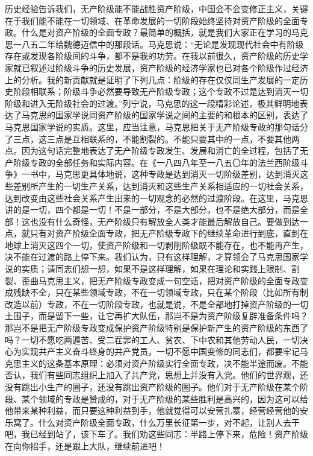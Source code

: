 \begin{maonote}
历史经验告诉我们，无产阶级能不能战胜资产阶级，中国会不会变修正主义，关键在于我们能不能在一切领域、在革命发展的一切阶段始终坚持对资产阶级的全面专政。什么是对资产阶级的全面专政？最简单的概括，就是我们大家正在学习的马克思一八五二年给魏德迈信中的那段话。马克思说：“无论是发现现代社会中有阶级存在或发现各阶级间的斗争，都不是我的功劳。在我以前很久，资产阶级的历史学家就已叙述过阶级斗争的历史发展，资产阶级的经济学家也已对各个阶级作过经济上的分析。我的新贡献就是证明了下列几点：阶级的存在仅仅同生产发展的一定历史阶段相联系；阶级斗争必然要导致无产阶级专政；这个专政不过是达到消灭一切阶级和进入无阶级社会的过渡。”列宁说，马克思的这一段精彩论述，极其鲜明地表达了马克思的国家学说同资产阶级的国家学说之间的主要的和根本的区别，表达了马克思国家学说的实质。这里，应当注意，马克思把关于无产阶级专政的那句话分了三点，这三点是互相联系的，不能割裂的。不能只要其中的一点，不要其他两点。因为这句话完整地表达了无产阶级专政发生、发展和消亡的全过程，包括了无产阶级专政的全部任务和实际内容。在《一八四八年至一八五〇年的法兰西阶级斗争》一书中，马克思更具体地说，这种专政是达到消灭一切阶级差别，达到消灭这些差别所产生的一切生产关系，达到消灭和这些生产关系相适应的一切社会关系，达到改变由这些社会关系产生出来的一切观念的必然的过渡阶段。在这里，马克思讲的是一切，四个都是一切！不是一部分，不是大部分，也不是绝大部分，而是全部！这也没有什么奇怪，无产阶级只有解放全人类才能最后解放自己。要做到达一点，就只有对资产阶级全面专政，把无产阶级专政下的继续革命进行到底，直到在地球上消灭这四个一切，使资产阶级和一切剥削阶级既不能存在，也不能再产生，决不能在过渡的路上停下来。我们认为，只有这样理解，才算领会了马克思国家学说的实质；请同志们想一想，如果不是这样理解，如果在理论和实践上限制、割裂、歪曲马克思主义，把无产阶级专政变成一句空话，把对资产阶级的全面专政变成残缺不全，只在某些领域专政，不在一切领域专政，只在某个阶段（比如所有制改造以前）专政，不在一切阶段专政，也就是说，不是全部地打掉资产阶级的一切土围子，而是留下一些，让它再扩大队伍，那岂不是为资产阶级复辟准备条件吗？那岂不是把无产阶级专政变成保护资产阶级特别是保护新产生的资产阶级的东西了吗？一切不愿吃两遍苦、受二茬罪的工人、贫农、下中农和其他劳动人民，一切决心为实现共产主义奋斗终身的共产党员，一切不愿中国变修的同志们，都要牢记马克思主义的这条基本原理：必须对资产阶级实行全面专政，决不能半途而废。不能否认，我们有些同志组织上加入了共产党，思想上并没有入党。他们的世界观，还没有跳出小生产的圈子，还没有跳出资产阶级的圈子。他们对于无产阶级在某个阶段、某个领域的专政是赞成的，对于无产阶级的某些胜利是高兴的，因为这可以给他带来某种利益，而只要这种利益到手，他就觉得可以安营扎寨，经营经营他的安乐窝了。什么对资产阶级全面专政，什么万里长征第一步，对不起，让别人去干吧，我已经到站了，该下车了。我们劝这些同志：半路上停下来，危险！资产阶级在向你招手，还是跟上大队，继续前进吧！


\end{maonote}
